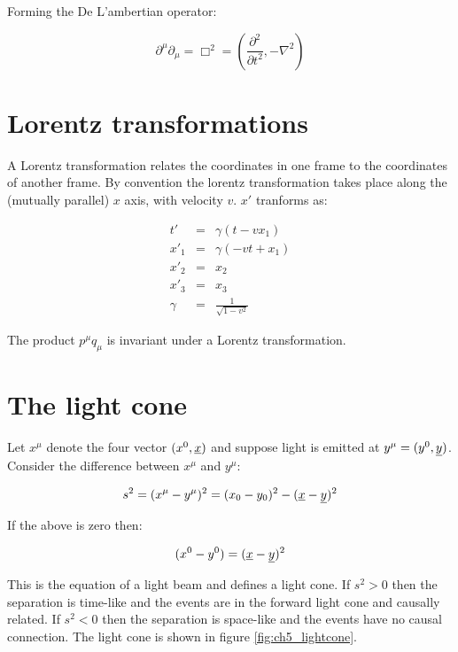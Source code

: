 Forming the De L'ambertian operator:

\[
  \partial^{\mu}\partial_{\mu} = \Box^2 = \left(\frac{\partial^2}{\partial t^2}, -\nabla^2\right)
\]

\section{Lorentz transformations}

A Lorentz transformation relates the coordinates in one frame to the coordinates of another frame.  By convention the lorentz transformation takes place along the (mutually parallel) $x$ axis, with velocity $v$.  $x'$ tranforms as:

\begin{eqnarray*}
  t'   & = & \gamma (t - vx_1)  \\
  x'_1 & = & \gamma (-vt + x_1) \\
  x'_2 & = & x_2 \\
  x'_3 & = & x_3 \\
  \gamma & = & \frac{1}{\sqrt{1-v^2}}
\end{eqnarray*}

The product $p^{\mu}q_{\mu}$ is invariant under a Lorentz transformation.

\section{The light cone}

Let $x^{\mu}$ denote the four vector $(x^0,\underline{x})$ and suppose light is emitted at $y^{\mu} = (y^0,\underline{y})$.  Consider the difference between $x^{\mu}$ and $y^{\mu}$:

\[
  s^2 = (x^{\mu} - y^{\mu})^2 = (x_0 - y_0)^2 - (\underline{x} - \underline{y})^2
\]

If the above is zero then:

\[
  (x^0 - y^0) = (\underline{x} - \underline{y})^2
\]

This is the equation of a light beam and defines a light cone.  If $s^2>0$ then the separation is time-like and the events are in the forward light cone and causally related.  If $s^2<0$ then the separation is space-like and the events have no causal connection.  The light cone is shown in figure \ref{fig:ch5_lightcone}.

